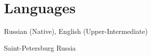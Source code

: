 \documentclass[11pt,a4paper,sans]{moderncv}        %
\begin{document}
		
		\section{Languages}
		Russian (Native), English (Upper-Intermediate)
		
		\vspace*{\fill}
		\name{}{}
		\title{}
\address{Novoizmailovsky prospect, 16k8}{Saint-Petersburg}{ Russia }%
		\makecvtitle
	
\end{document}

